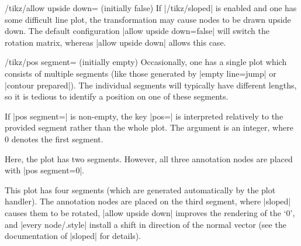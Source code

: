 {\begin{key}{/tikz/allow upside down= (initially false)}
    If |/tikz/sloped| is enabled and one has some difficult line plot, the
    transformation may cause nodes to be drawn upside down. The default
    configuration |allow upside down=false| will switch the rotation matrix,
    whereas |allow upside down| allows this case.
\end{key}

\begin{key}{/tikz/pos segment= (initially empty)}
    Occasionally, one has a single plot which consists of multiple segments
    (like those generated by |empty line=jump| or |contour prepared|). The
    individual segments will typically have different lengths, so it is tedious
    to identify a position on one of these segments.

    If |pos segment=| is non-empty, the key
    |pos=| is interpreted relatively to the provided segment
    rather than the whole plot. The argument  is an
    integer, where $0$ denotes the first segment.
\begin{codeexample}[]
\end{codeexample}
    Here, the plot has two segments. However, all three annotation nodes are
    placed with |pos segment=0|.

\pgfplotsexpensiveexample
\begin{codeexample}[]
\end{codeexample}
    This plot has four segments (which are generated automatically by the plot
    handler). The annotation nodes are placed on the third segment, where
    |sloped| causes them to be rotated, |allow upside down| improves the
    rendering of the `$0$', and |every node/.style| install a shift in
    direction of the normal vector (see the documentation of |sloped| for
    details).
\end{key}

}
